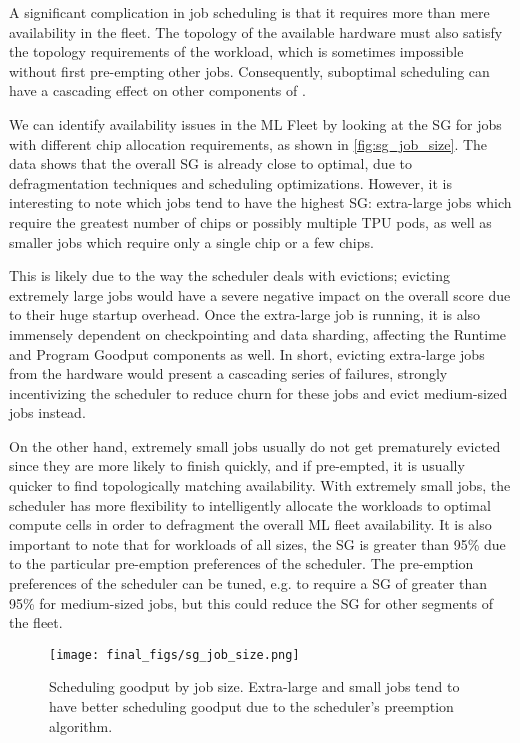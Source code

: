 A significant complication in job scheduling is that it requires more than mere availability in the fleet. The topology of the available hardware must also satisfy the topology requirements of the workload, which is sometimes impossible without first pre-empting other jobs. Consequently, suboptimal scheduling can have a cascading effect on other components of \mpg.



We can identify availability issues in the ML Fleet by looking at the SG for jobs with different chip allocation requirements, as shown in \autoref{fig:sg_job_size}. The data shows that the overall SG is already close to optimal, due to defragmentation techniques and scheduling optimizations. However, it is interesting to note which jobs tend to have the highest SG: extra-large jobs which require the greatest number of chips or possibly multiple TPU pods, as well as smaller jobs which require only a single chip or a few chips. 

This is likely due to the way the scheduler deals with evictions; evicting extremely large jobs would have a severe negative impact on the overall \mpg score due to their huge startup overhead. Once the extra-large job is running, it is also immensely dependent on checkpointing and data sharding, affecting the Runtime and Program Goodput components as well. In short, evicting extra-large jobs from the hardware would present a cascading series of failures, strongly incentivizing the scheduler to reduce churn for these jobs and evict medium-sized jobs instead. 

On the other hand, extremely small jobs usually do not get prematurely evicted since they are more likely to finish quickly, and if pre-empted, it is usually quicker to find topologically matching availability. With extremely small jobs, the scheduler has more flexibility to intelligently allocate the workloads to optimal compute cells in order to defragment the overall ML fleet availability. It is also important to note that for workloads of all sizes, the SG is greater than 95\% due to the particular pre-emption preferences of the scheduler. The pre-emption preferences of the scheduler can be tuned, e.g. to require a SG of greater than 95\% for medium-sized jobs, but this could reduce the SG for other segments of the fleet.


\begin{figure}[t]
    \centering
    \texttt{[image: final\_figs/sg\_job\_size.png]}
    \caption{Scheduling goodput by job size. Extra-large and small jobs tend to have better scheduling goodput due to the scheduler's preemption algorithm.}
    \label{fig:sg_job_size}
\end{figure}

